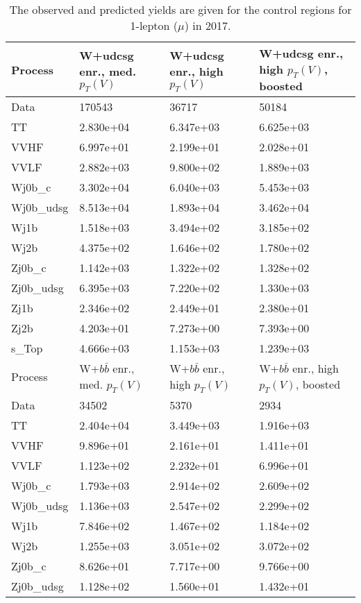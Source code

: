 \begin{table}
\centering
\caption[2017 1-lepton ($\mu$) control region yields]{
                  The observed and predicted yields are given for the
                  control regions for 1-lepton ($\mu$) in 2017.
                  }
{\footnotesize
\begin{tabularx}{0.8\textwidth}{|X|X|X|X|}
\hline
Process & W+udcsg enr., med. $p_{T}(V)$ & W+udcsg enr., high $p_{T}(V)$ & W+udcsg enr., high $p_{T}(V)$, boosted \\
\hline
Data & 170543 & 36717 & 50184 \\
\hline
TT & 2.830e+04 & 6.347e+03 & 6.625e+03 \\
VVHF & 6.997e+01 & 2.199e+01 & 2.028e+01 \\
VVLF & 2.882e+03 & 9.800e+02 & 1.889e+03 \\
Wj0b\_c & 3.302e+04 & 6.040e+03 & 5.453e+03 \\
Wj0b\_udsg & 8.513e+04 & 1.893e+04 & 3.462e+04 \\
Wj1b & 1.518e+03 & 3.494e+02 & 3.185e+02 \\
Wj2b & 4.375e+02 & 1.646e+02 & 1.780e+02 \\
Zj0b\_c & 1.142e+03 & 1.322e+02 & 1.328e+02 \\
Zj0b\_udsg & 6.395e+03 & 7.220e+02 & 1.330e+03 \\
Zj1b & 2.346e+02 & 2.449e+01 & 2.380e+01 \\
Zj2b & 4.203e+01 & 7.273e+00 & 7.393e+00 \\
s\_Top & 4.666e+03 & 1.153e+03 & 1.239e+03 \\
\hline
\hline
Process & W+$b\bar{b}$ enr., med. $p_{T}(V)$ & W+$b\bar{b}$ enr., high $p_{T}(V)$ & W+$b\bar{b}$ enr., high $p_{T}(V)$, boosted \\
\hline
Data & 34502 & 5370 & 2934 \\
\hline
TT & 2.404e+04 & 3.449e+03 & 1.916e+03 \\
VVHF & 9.896e+01 & 2.161e+01 & 1.411e+01 \\
VVLF & 1.123e+02 & 2.232e+01 & 6.996e+01 \\
Wj0b\_c & 1.793e+03 & 2.914e+02 & 2.609e+02 \\
Wj0b\_udsg & 1.136e+03 & 2.547e+02 & 2.299e+02 \\
Wj1b & 7.846e+02 & 1.467e+02 & 1.184e+02 \\
Wj2b & 1.255e+03 & 3.051e+02 & 3.072e+02 \\
Zj0b\_c & 8.626e+01 & 7.717e+00 & 9.766e+00 \\
Zj0b\_udsg & 1.128e+02 & 1.560e+01 & 1.432e+01 \\

\end{tabularx}}
\end{table}
